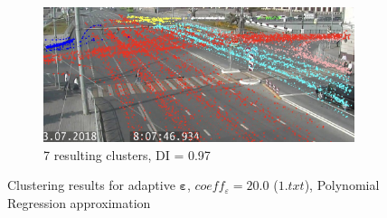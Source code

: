 \begin{figure}[!htb]
\begin{subfigure}[!htb]{0.495\textwidth}
		\label{fig:8cl-di-1}
	\end{subfigure}
	\hfill
	\begin{subfigure}[!htb]{0.495\textwidth}
		\centering{}
		\includegraphics[width=\textwidth]{images/7cl-di-1.jpeg}
		\caption{7 resulting clusters, DI = 0.97}
		\label{fig:7cl-di-1}
	\end{subfigure}
	\caption{Clustering results for adaptive $\bm{\varepsilon}$, $coeff_\varepsilon = 20.0$ ($1.txt$), Polynomial Regression approximation}
	\label{fig:clust-res-1}
\end{figure}

